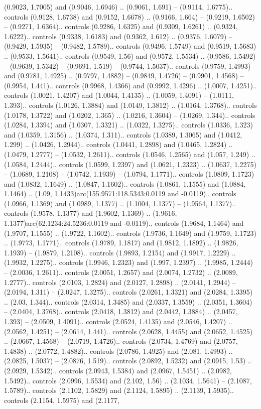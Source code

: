 (0.9023, 1.7005) and (0.9046, 1.6946) .. (0.9061, 1.691) -- (0.9114, 1.6775).. controls (0.9128, 1.6738) and (0.9152, 1.6678) .. (0.9166, 1.664) -- (0.9219, 1.6502) -- (0.9271, 1.6364).. controls (0.9286, 1.6325) and (0.9309, 1.6261) .. (0.9324, 1.6222).. controls (0.9338, 1.6183) and (0.9362, 1.612) .. (0.9376, 1.6079) -- (0.9429, 1.5935) -- (0.9482, 1.5789).. controls (0.9496, 1.5749) and (0.9519, 1.5683) .. (0.9533, 1.5641).. controls (0.9549, 1.56) and (0.9572, 1.5534) .. (0.9586, 1.5492) -- (0.9639, 1.5342) -- (0.9691, 1.519) -- (0.9744, 1.5037).. controls (0.9759, 1.4993) and (0.9781, 1.4925) .. (0.9797, 1.4882) -- (0.9849, 1.4726) -- (0.9901, 1.4568) -- (0.9954, 1.441).. controls (0.9968, 1.4366) and (0.9992, 1.4296) .. (1.0007, 1.4251).. controls (1.0021, 1.4207) and (1.0044, 1.4135) .. (1.0059, 1.4091) -- (1.0111, 1.393).. controls (1.0126, 1.3884) and (1.0149, 1.3812) .. (1.0164, 1.3768).. controls (1.0178, 1.3722) and (1.0202, 1.365) .. (1.0216, 1.3604) -- (1.0269, 1.344).. controls (1.0284, 1.3394) and (1.0307, 1.3321) .. (1.0322, 1.3275).. controls (1.0336, 1.323) and (1.0359, 1.3156) .. (1.0374, 1.311).. controls (1.0389, 1.3065) and (1.0412, 1.299) .. (1.0426, 1.2944).. controls (1.0441, 1.2898) and (1.0465, 1.2824) .. (1.0479, 1.2777) -- (1.0532, 1.2611).. controls (1.0546, 1.2565) and (1.057, 1.249) .. (1.0584, 1.2444).. controls (1.0599, 1.2397) and (1.0621, 1.2323) .. (1.0637, 1.2275) -- (1.0689, 1.2108) -- (1.0742, 1.1939) -- (1.0794, 1.1771).. controls (1.0809, 1.1723) and (1.0832, 1.1649) .. (1.0847, 1.1602).. controls (1.0861, 1.1555) and (1.0884, 1.1464) .. (1.09, 1.1433)arc(155.9571:118.5343:0.0119 and -0.0119).. controls (1.0966, 1.1369) and (1.0989, 1.1377) .. (1.1004, 1.1377) -- (1.9564, 1.1377).. controls (1.9578, 1.1377) and (1.9602, 1.1369) .. (1.9616, 1.1377)arc(62.1234:24.5236:0.0119 and -0.0119).. controls (1.9684, 1.1464) and (1.9707, 1.1555) .. (1.9722, 1.1602).. controls (1.9736, 1.1649) and (1.9759, 1.1723) .. (1.9773, 1.1771).. controls (1.9789, 1.1817) and (1.9812, 1.1892) .. (1.9826, 1.1939) -- (1.9879, 1.2108).. controls (1.9893, 1.2154) and (1.9917, 1.2229) .. (1.9932, 1.2275).. controls (1.9946, 1.2323) and (1.997, 1.2397) .. (1.9985, 1.2444) -- (2.0036, 1.2611).. controls (2.0051, 1.2657) and (2.0074, 1.2732) .. (2.0089, 1.2777).. controls (2.0103, 1.2824) and (2.0127, 1.2898) .. (2.0141, 1.2944) -- (2.0194, 1.311) -- (2.0247, 1.3275).. controls (2.0261, 1.3321) and (2.0284, 1.3395) .. (2.03, 1.344).. controls (2.0314, 1.3485) and (2.0337, 1.3559) .. (2.0351, 1.3604) -- (2.0404, 1.3768).. controls (2.0418, 1.3812) and (2.0442, 1.3884) .. (2.0457, 1.393) -- (2.0509, 1.4091).. controls (2.0524, 1.4135) and (2.0546, 1.4207) .. (2.0562, 1.4251) -- (2.0614, 1.441).. controls (2.0628, 1.4455) and (2.0652, 1.4525) .. (2.0667, 1.4568) -- (2.0719, 1.4726).. controls (2.0734, 1.4769) and (2.0757, 1.4838) .. (2.0772, 1.4882).. controls (2.0786, 1.4925) and (2.081, 1.4993) .. (2.0825, 1.5037) -- (2.0876, 1.519).. controls (2.0892, 1.5232) and (2.0915, 1.53) .. (2.0929, 1.5342).. controls (2.0943, 1.5384) and (2.0967, 1.5451) .. (2.0982, 1.5492).. controls (2.0996, 1.5534) and (2.102, 1.56) .. (2.1034, 1.5641) -- (2.1087, 1.5789).. controls (2.1102, 1.5829) and (2.1124, 1.5895) .. (2.1139, 1.5935).. controls (2.1154, 1.5975) and (2.1177, 